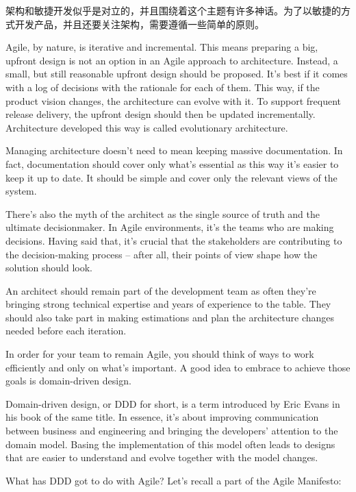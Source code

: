 
架构和敏捷开发似乎是对立的，并且围绕着这个主题有许多神话。为了以敏捷的方式开发产品，并且还要关注架构，需要遵循一些简单的原则。

Agile, by nature, is iterative and incremental. This means preparing a big, upfront design is not an option in an Agile approach to architecture. Instead, a small, but still reasonable upfront design should be proposed. It's best if it comes with a log of decisions with the rationale for each of them. This way, if the product vision changes, the architecture can evolve with it. To support frequent release delivery, the upfront design should then be updated incrementally. Architecture developed this way is called evolutionary architecture.

Managing architecture doesn't need to mean keeping massive documentation. In fact, documentation should cover only what's essential as this way it's easier to keep it up to date. It should be simple and cover only the relevant views of the system.

There's also the myth of the architect as the single source of truth and the ultimate decisionmaker. In Agile environments, it's the teams who are making decisions. Having said that, it's crucial that the stakeholders are contributing to the decision-making process – after all, their points of view shape how the solution should look.

An architect should remain part of the development team as often they're bringing strong technical expertise and years of experience to the table. They should also take part in making estimations and plan the architecture changes needed before each iteration.

In order for your team to remain Agile, you should think of ways to work efficiently and only on what's important. A good idea to embrace to achieve those goals is domain-driven design.



Domain-driven design, or DDD for short, is a term introduced by Eric Evans in his book of the same title. In essence, it's about improving communication between business and engineering and bringing the developers' attention to the domain model. Basing the implementation of this model often leads to designs that are easier to understand and evolve together with the model changes.

What has DDD got to do with Agile? Let's recall a part of the Agile Manifesto:



